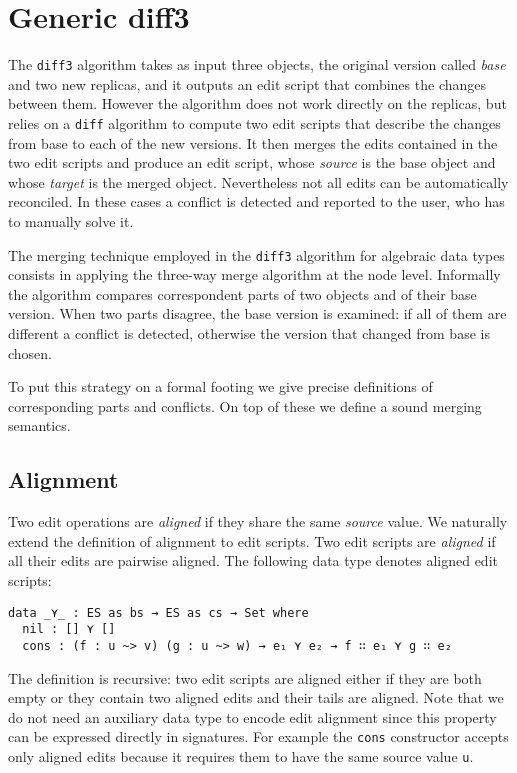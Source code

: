 \documentclass[preprint]{sigplanconf}
\begin{document}
\section{Generic diff3}
	The \texttt{diff3} algorithm takes as input three objects, the original
	version called \emph{base} and two new replicas, and it outputs an
	edit script that combines the changes between them.
	However the algorithm does not work directly on the replicas, but relies
	on a \texttt{diff} algorithm to compute two edit scripts that describe
	the changes from base to each of the new versions.
	It then merges the edits contained in the two edit scripts and produce
	an edit script, whose \emph{source} is the base object and whose 
	\emph{target} is the merged object.
	Nevertheless not all edits can be automatically reconciled.
	In these cases a conflict is detected and reported to the user, who has
	to manually solve it.
		
	The merging technique employed in the \texttt{diff3} algorithm for
	algebraic data types consists in applying the three-way merge algorithm
	at the node level. 
	Informally the algorithm compares correspondent parts 
	of two objects and of their base version.
	When two parts disagree, the base version is examined:
	if all of them are different a conflict is detected, 
        otherwise the version that changed from base is chosen.
	
	To put this strategy on a formal footing we give precise definitions
	of corresponding parts and conflicts.
	On top of these we define a sound merging semantics.

	\subsection{Alignment}
	Two edit operations are \emph{aligned} if they share the same 
	\emph{source} value. We naturally extend the definition of alignment to edit 
	scripts.	Two edit scripts are \emph{aligned} if all their edits are pairwise 
	aligned. The following data type denotes aligned edit scripts:	
\begin{verbatim}
data _⋎_ : ES as bs → ES as cs → Set where
  nil : [] ⋎ []
  cons : (f : u ~> v) (g : u ~> w) → e₁ ⋎ e₂ → f ∷ e₁ ⋎ g ∷ e₂ 
\end{verbatim}
	The definition is recursive: two edit scripts are aligned either if they are
	both empty or they contain two aligned edits and their tails are aligned.
	Note that we do not need an auxiliary data type to encode edit 
	alignment since this property can be expressed directly in signatures.
	For example the \texttt{cons} constructor accepts only aligned edits
	because it requires them to have the same source value \texttt{u}.
	
\end{document}
